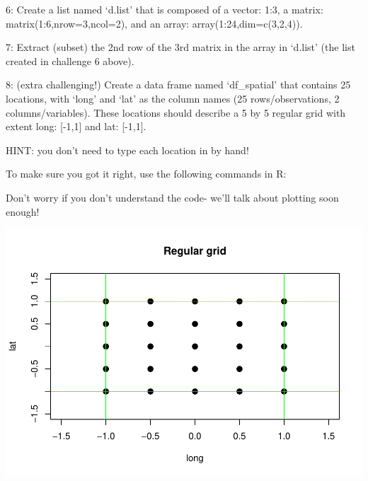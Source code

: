 \documentclass[]{article}
\newenvironment{Shaded}{\begin{snugshade}}{\end{snugshade}}
\newcommand{\KeywordTok}[1]{\textcolor[rgb]{0.13,0.29,0.53}{\textbf{#1}}}
\newcommand{\DataTypeTok}[1]{\textcolor[rgb]{0.13,0.29,0.53}{#1}}
\newcommand{\DecValTok}[1]{\textcolor[rgb]{0.00,0.00,0.81}{#1}}
\newcommand{\FloatTok}[1]{\textcolor[rgb]{0.00,0.00,0.81}{#1}}
\newcommand{\StringTok}[1]{\textcolor[rgb]{0.31,0.60,0.02}{#1}}
\newcommand{\CommentTok}[1]{\textcolor[rgb]{0.56,0.35,0.01}{\textit{#1}}}
\newcommand{\OperatorTok}[1]{\textcolor[rgb]{0.81,0.36,0.00}{\textbf{#1}}}
\newcommand{\NormalTok}[1]{#1}
\begin{document}
6: Create a list named `d.list' that is composed of a vector: 1:3, a
matrix: matrix(1:6,nrow=3,ncol=2), and an array:
array(1:24,dim=c(3,2,4)).

7: Extract (subset) the 2nd row of the 3rd matrix in the array in
`d.list' (the list created in challenge 6 above).

8: (extra challenging!) Create a data frame named `df\_spatial' that
contains 25 locations, with `long' and `lat' as the column names (25
rows/observations, 2 columns/variables). These locations should describe
a 5 by 5 regular grid with extent long: {[}-1,1{]} and lat: {[}-1,1{]}.

HINT: you don't need to type each location in by hand!

To make sure you got it right, use the following commands in R:

Don't worry if you don't understand the code- we'll talk about plotting
soon enough!

\begin{Shaded}
\end{Shaded}

\includegraphics{module1_1_files/figure-latex/unnamed-chunk-46-1.pdf}
\end{document}

